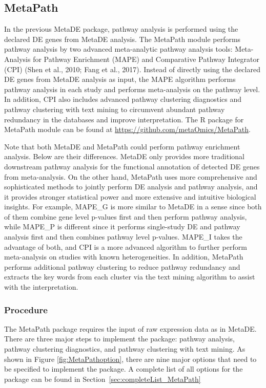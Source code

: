 \subsection{MetaPath}

In the previous MetaDE package,
pathway analysis is performed using the declared DE genes from MetaDE analysis.
The MetaPath module  performs pathway analysis by two advanced meta-analytic pathway analysis tools: 
Meta-Analysis for Pathway Enrichment (MAPE) and Comparative Pathway Integrator (CPI) (Shen et al., 2010; Fang et al., 2017). 
Instead of directly using the declared DE genes from MetaDE analysis as input, 
the MAPE algorithm performs pathway analysis in each study and performs meta-analysis on the pathway level.
In addition, CPI also includes advanced pathway clustering diagnostics and pathway clustering with text mining to circumvent abundant pathway redundancy in the databases and improve interpretation. 
The R package for MetaPath module can be found at \url{https://github.com/metaOmics/MetaPath}.

Note that both MetaDE and MetaPath could perform pathway enrichment analysis.
Below are their differences.
MetaDE only provides more traditional downstream pathway analysis for the functional annotation of detected DE genes from meta-analysis. On the other hand, MetaPath uses more comprehensive and sophisticated methods to jointly perform DE analysis and pathway analysis, 
and it provides stronger statistical power and more extensive and intuitive biological insights. 
For example, MAPE\_G is more similar to MetaDE in a sense since both of them combine gene level p-values first and then perform pathway analysis, while MAPE\_P is different since it performs single-study DE and pathway analysis first and then combines pathway level p-values. 
MAPE\_I takes the advantage of both, 
and CPI is a more advanced algorithm to further perform meta-analysis on studies with known heterogeneities. In addition, MetaPath performs additional pathway clustering to reduce pathway redundancy and extracts the key words from each cluster via the text mining algorithm to assist with the interpretation. 

\subsubsection{Procedure}
The MetaPath package requires the input of raw expression data as in MetaDE. 
There are three major steps to implement the package: pathway analysis, pathway clustering diagnostics, 
and pathway clustering with text mining. 
As shown in Figure \ref{fig:MetaPathoption}, there are nine major options that need to be specified to implement the package.
A complete list of all options for the package can be found in Section~\ref{sec:completeList_MetaPath} 


